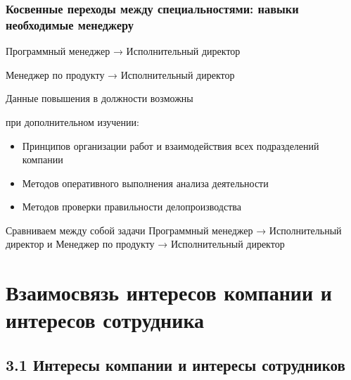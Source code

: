 \documentclass{../industrial-development}
\begin{document}
\begin{frame} \frametitle{Косвенные переходы между специальностями: навыки необходимые менеджеру}

\begin{block}{Программный менеджер → Исполнительный директор 

Менеджер по продукту  → Исполнительный директор }

Данные повышения в должности возможны 

при дополнительном изучении:
  \end{block}
 \begin{itemize}
  \item Принципов организации работ и взаимодействия всех подразделений компании
  \item Методов оперативного выполнения анализа деятельности
  \item Методов проверки правильности делопроизводства
  \end{itemize}
\end{frame}



\lecturenotes

Сравниваем между собой задачи Программный менеджер → Исполнительный директор и
Менеджер по продукту  → Исполнительный директор




\section{Взаимосвязь интересов компании и интересов сотрудника }

\subsection{3.1 Интересы компании и интересы сотрудников }
\end{document}
